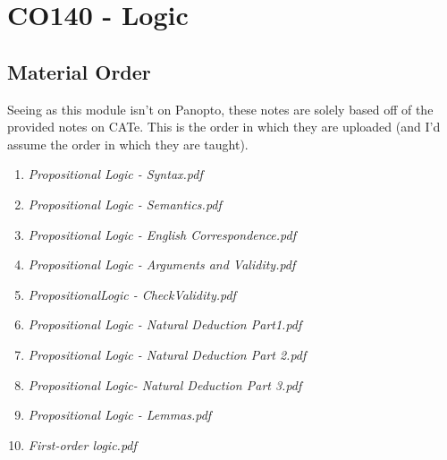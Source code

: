 \documentclass[a4paper, 12pt]{article}
\begin{document}
    \section*{CO140 - Logic}
        \subsection*{Material Order}
            Seeing as this module isn't on Panopto, these notes are solely based off of the provided notes on CATe. This is the order in which they are uploaded (and I'd assume the order in which they are taught).
            \begin{enumerate}[1.]
                \itemsep0em
                \item \textit{Propositional Logic - Syntax.pdf}
                \item \textit{Propositional Logic - Semantics.pdf}
                \item \textit{Propositional Logic - English Correspondence.pdf}
                \item \textit{Propositional Logic - Arguments and Validity.pdf}
                \item \textit{PropositionalLogic - CheckValidity.pdf}
                \item \textit{Propositional Logic - Natural Deduction Part1.pdf}
                \item \textit{Propositional Logic - Natural Deduction Part 2.pdf}
                \item \textit{Propositional Logic- Natural Deduction Part 3.pdf}
                \item \textit{Propositional Logic - Lemmas.pdf}
                \item \textit{First-order logic.pdf}
            \end{enumerate}
\end{document}
